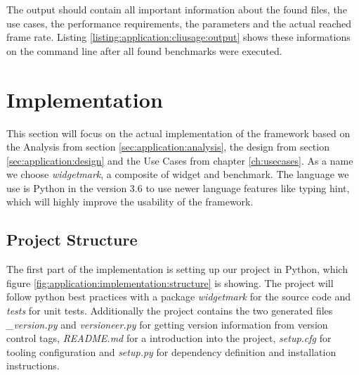 

The  output should contain all important information about the found files,
the use cases, the performance requirements, the parameters and the actual
reached frame rate. Listing \ref{listing:application:cliusage:output} shows these
informations on the command line after all found benchmarks were executed.







\section{Implementation} \label{sec:application:implementation}

This section will focus on the actual implementation of the framework based on
the Analysis from section \ref{sec:application:analysis}, the design from
section \ref{sec:application:design} and the Use Cases from chapter
\ref{ch:usecases}. As a name we choose \emph{widgetmark}, a composite of widget
and benchmark.  The language we use is Python in the version 3.6 to use newer
language features like typing hint, which will highly improve the usability of
the framework.

\subsection{Project Structure}

The first part of the implementation is setting up our project in Python, which
figure \ref{fig:application:implementation:structure} is showing. The project
will follow python best practices with a package \emph{widgetmark} for the
source code and \emph{tests} for unit tests. Additionally the project contains
the two generated files \emph{\_version.py} and \emph{versioneer.py} for getting
version information from version control tags, \emph{README.md} for a
introduction into the project, \emph{setup.cfg} for tooling configuration and
\emph{setup.py} for dependency definition and installation instructions.

